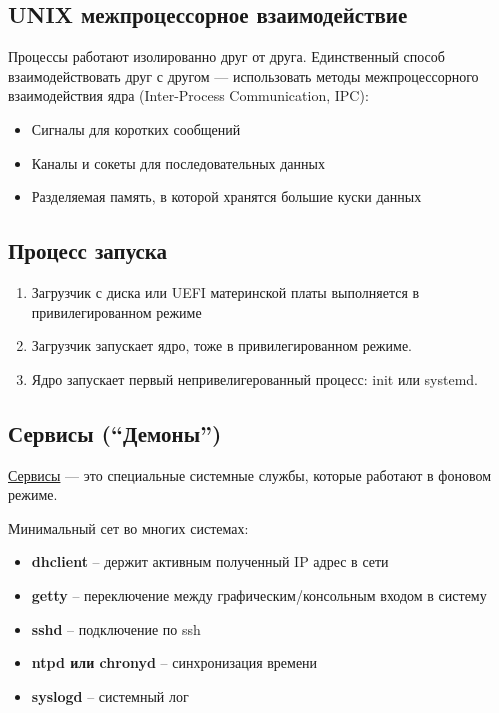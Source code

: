 \subsection{UNIX межпроцессорное взаимодействие}

Процессы работают изолированно друг от друга. Единственный способ взаимодействовать друг с другом --- использовать методы межпроцессорного взаимодействия ядра (Inter-Process Communication, IPC):

\begin{itemize}
	\item {Сигналы} для коротких сообщений
	\item {Каналы и сокеты} для последовательных данных
	\item {Разделяемая память}, в которой хранятся большие куски данных
\end{itemize}

\subsection{Процесс запуска}

\begin{enumerate}
	\item {Загрузчик} с диска или UEFI материнской платы выполняется в привилегированном режиме
	\item Загрузчик запускает {ядро}, тоже в привилегированном режиме.
	\item Ядро запускает первый непривелигерованный процесс: {init или systemd}.
\end{enumerate}

\subsection{Сервисы (``Демоны'')}

\begin{Def}
	\underline{Сервисы} --- это специальные системные службы, которые работают в фоновом режиме.
\end{Def}

\newpage

Минимальный сет во многих системах:

\begin{itemize}
	\item \textbf{dhclient} -- держит активным полученный IP адрес в сети
	\item \textbf{getty} -- переключение между графическим/консольным входом в систему
	\item \textbf{sshd} -- подключение по ssh
	\item \textbf{ntpd или chronyd} -- синхронизация времени
	\item \textbf{syslogd} -- системный лог
\end{itemize}

